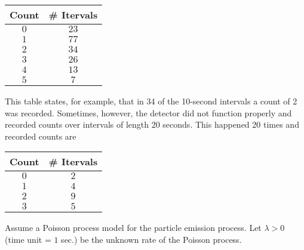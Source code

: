 \documentclass{tufte-book}
\begin{document}
\begin{table}[H]
\centering
\begin{tabular}{cc}
Count & \# Itervals \\ \hline
$0$   & $23$        \\
$1$   & $77$        \\
$2$   & $34$        \\
$3$   & $26$        \\
$4$   & $13$        \\
$5$   & $7$
\end{tabular}
\end{table}

This table states, for example, that in 34 of the 10-second intervals a count of 2 was recorded.  Sometimes, however, the detector did not function properly and recorded counts over intervals of length 20 seconds.  This happened 20 times and recorded counts are

\begin{table}[H]
\centering
\begin{tabular}{cc}
Count & \# Itervals \\ \hline
$0$   & $2$        \\
$1$   & $4$        \\
$2$   & $9$        \\
$3$   & $5$        \\
\end{tabular}
\end{table}

Assume a Poisson process model for the particle emission process.  Let $\lambda > 0$ (time unit = $1$ sec.) be the unknown rate of the Poisson process.
\end{document}
